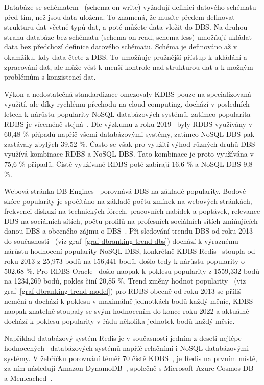 \documentclass[czech,master,dept460,male,csharp,cpdeclaration]{diploma}
\begin{document}
	Databáze se schématem~\cite{schemaless-vs-schema} (schema-on-write) vyžadují definici datového schématu před tím, než jsou data uložena. To znamená, že musíte předem definovat strukturu dat včetně typů dat, a poté můžete data vložit do DBS. Na druhou stranu databáze bez schématu (schema-on-read, schema-less) umožňují ukládat data bez předchozí definice datového schématu. Schéma je definováno až v okamžiku, kdy data čtete z DBS. To umožňuje pružnější přístup k ukládání a zpracování dat, ale může vést k menší kontrole nad strukturou dat a k možným problémům s konzistencí dat.
	
	Výkon a nedostatečná standardizace omezovaly KDBS pouze na specializovaná využití, ale díky rychlému přechodu na cloud computing, dochází v posledních letech k nárůstu popularity NoSQL databázových systémů, zatímco popularita RDBS je víceméně stejná~\cite{dbranking-trend-by-model}. Dle výzkumu z roku 2019~\cite{scalegrid-sql-vs-nosql} byly RDBS využívány v 60,48 \% případů napříč všemi databázovými systémy, zatímco NoSQL DBS pak zastávaly zbylých 39,52 \%. Často se však pro využití výhod různých druhů DBS využívá kombinace RDBS a NoSQL DBS. Tato kombinace je proto využívána v 75,6 \% případů. Čistě využívané RDBS poté zabírají 16,6 \% a NoSQL DBS 9,8 \%. 
	
	Webová stránka DB-Engines~\cite{dbranking-web-index} porovnává DBS na základě popularity. Bodové skóre popularity je spočítáno na základě počtu zmínek na webových stránkách, frekvenci diskuzí na technických fórech, pracovních nabídek a poptávek, relevance DBS na sociálních sítích, počtu profilů na profesních sociálních sítích zmiňujících danou DBS a obecného zájmu o DBS~\cite{dbranking-ranking-definition}. Při sledování trendu DBS od roku 2013 do současnosti~\cite{dbranking-trend-by-dbs} (viz graf~\ref{graf-dbranking-trend-dbs}) dochází k výraznému nárůstu hodnocení popularity NoSQL DBS, konkrétně KDBS Redis~\cite{redis} stoupla od roku 2013 z 25,973 bodů na 156,441 bodů, došlo tedy k nárůstu popularity o 502,68 \%. Pro RDBS Oracle~\cite{oracle-index} došlo naopak k poklesu popularity z 1559,332 bodů na 1234,269 bodů, pokles činí 20,85 \%. Trend změny hodnot popularity~\cite{dbranking-trend-by-model} (viz graf~\ref{graf-dbranking-trend-model}) pro RDBS obecně od roku 2013 se příliš nemění a dochází k poklesu v maximálně jednotkách bodů každý měníc, KDBS naopak znatelně stoupaly se svým hodnocením do konce roku 2022 a aktuálně dochází k poklesu popularity v řádu několika jednotek bodů každý měsíc.
	
	Například databázový systém Redis je v současnosti jedním z deseti nejlépe hodnocených~\cite{db-engineers-ranking} databázových systémů napříč relačními i NoSQL databázovými systémy. V žebříčku porovnání téměř 70 čistě KDBS~\cite{db-engineers-ranking-kdbs}, je Redis na prvním místě, za ním následují Amazon DynamoDB~\cite{dynamodb}, společně s Microsoft Azure Cosmos DB~\cite{azure-cosmos-db} a Memcached~\cite{memcached}.
	
\end{document}
